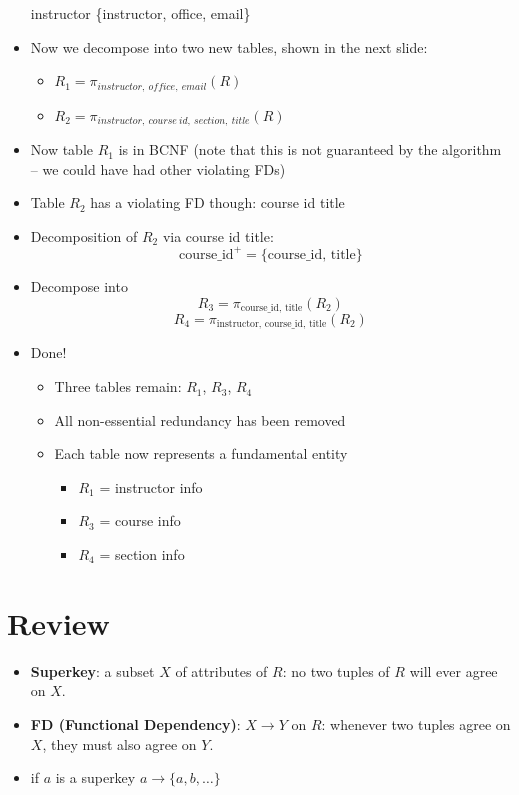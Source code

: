 \documentclass{../cheatsheet}
\begin{document}
\begin{multicols*}{2}
\begin{itemize}
        \begin{center}
            instructor \textrightarrow \{instructor, office, email\}
        \end{center}
    \item Now we decompose into two new tables, shown in the next slide:
        \begin{itemize}
            \item $R_1 = \pi_{instructor,\ office,\ email}(R)$
            \item $R_2 = \pi_{instructor,\ course\ id,\ section,\ title}(R)$
        \end{itemize}
    \item Now table $R_1$ is in BCNF (note that this is not guaranteed by the
        algorithm -- we could have had other violating FDs)
    \item Table $R_2$ has a violating FD though: course id \textrightarrow title
    \item Decomposition of $R_2$ via course id \textrightarrow title:
        \[\text{course\_id}^+ = \{\text{course\_id, title}\}\]
    \item Decompose into
        \[R_3 = \pi_{\text{course\_id, title}}(R_2)\]
        \[R_4 = \pi_{\text{instructor, course\_id, title}}(R_2)\]
    \item Done!
        \begin{itemize}
            \item Three tables remain: $R_1$, $R_3$, $R_4$
            \item All non-essential redundancy has been removed
            \item Each table now represents a fundamental entity
                \begin{itemize}
                    \item $R_1$ = instructor info
                    \item $R_3$ = course info
                    \item $R_4$ = section info
                \end{itemize}
        \end{itemize}
\end{itemize}

\section{Review}
\begin{itemize}
    \item \textbf{Superkey}: a subset $X$ of attributes of $R$: no two tuples of
        $R$ will ever agree on $X$.
    \item \textbf{FD (Functional Dependency)}: $X \rightarrow Y$ on $R$:
        whenever two tuples agree on $X$, they must also agree on $Y$.
    \item if $a$ is a superkey $a \rightarrow \{a, b, \dots\}$
\end{itemize}


\end{multicols*}
\end{document}
